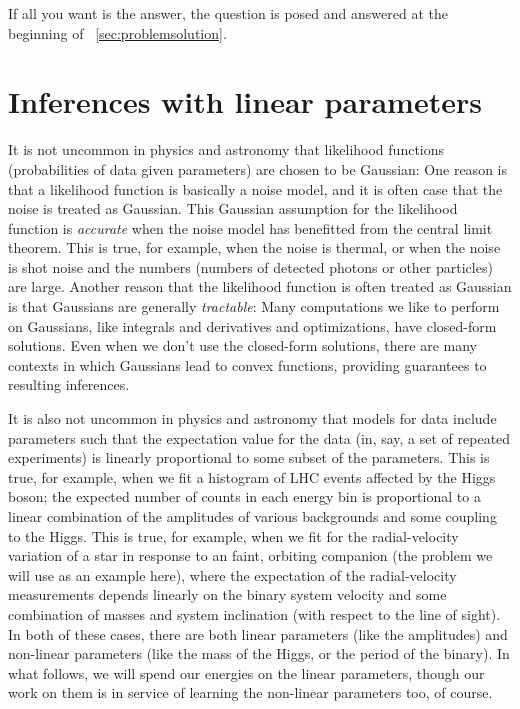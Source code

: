 If all you want is the answer, the question is posed and answered
at the beginning of \sectionname~\ref{sec:problemsolution}.

\section{Inferences with linear parameters}

It is not uncommon in physics and astronomy that likelihood functions
(probabilities of data given parameters) are chosen to be Gaussian:
One reason is that a likelihood function is basically a noise model,
and it is often case that the noise is treated as Gaussian.
This Gaussian assumption for the likelihood function is
\emph{accurate} when the noise model has benefitted from the central
limit theorem.
This is true, for example, when the noise is thermal, or when the
noise is shot noise and the numbers (numbers of detected photons or other
particles) are large.
Another reason that the likelihood function is often treated as
Gaussian is that Gaussians are generally \emph{tractable}:
Many computations we like to perform on Gaussians, like integrals and
derivatives and optimizations, have closed-form solutions.
Even when we don't use the closed-form solutions, there are many
contexts in which Gaussians lead to convex functions,
providing guarantees to resulting inferences.

It is also not uncommon in physics and astronomy that models for data
include parameters such that the expectation value for the data (in,
say, a set of repeated experiments) is linearly proportional to some
subset of the parameters.
This is true, for example, when we fit a histogram of LHC events
affected by the Higgs boson; the expected number of counts in each
energy bin is proportional to a linear combination of the amplitudes
of various backgrounds and some coupling to the Higgs.
This is true, for example, when we fit for the radial-velocity
variation of a star in response to an faint, orbiting companion (the
problem we will use as an example here), where the expectation of the
radial-velocity measurements depends linearly on the binary system
velocity and some combination of masses and system inclination (with
respect to the line of sight).
In both of these cases, there are both linear parameters (like the
amplitudes) and non-linear parameters (like the mass of the Higgs, or
the period of the binary).
In what follows, we will spend our energies on the linear parameters,
though our work on them is in service of learning the non-linear
parameters too, of course.

